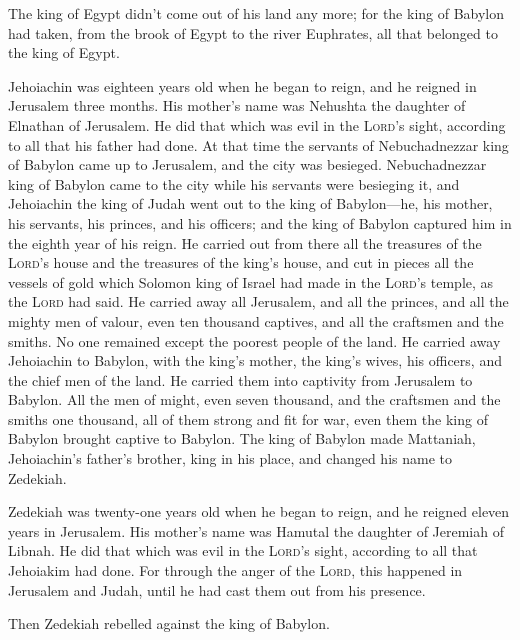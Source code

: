  The king of Egypt didn't come out of his land any more;
for the king of Babylon had taken, from the brook of Egypt to the river
Euphrates, all that belonged to the king of Egypt.

 Jehoiachin was eighteen years old when he began to reign,
and he reigned in Jerusalem three months. His mother's name was Nehushta
the daughter of Elnathan of Jerusalem.  He did that which
was evil in the \textsc{Lord}'s sight, according to all that his father
had done.  At that time the servants of Nebuchadnezzar
king of Babylon came up to Jerusalem, and the city was besieged.
 Nebuchadnezzar king of Babylon came to the city while
his servants were besieging it,  and Jehoiachin the king
of Judah went out to the king of Babylon---he, his mother, his servants,
his princes, and his officers; and the king of Babylon captured him in
the eighth year of his reign.  He carried out from there
all the treasures of the \textsc{Lord}'s house and the treasures of the
king's house, and cut in pieces all the vessels of gold which Solomon
king of Israel had made in the \textsc{Lord}'s temple, as the
\textsc{Lord} had said.  He carried away all Jerusalem,
and all the princes, and all the mighty men of valour, even ten thousand
captives, and all the craftsmen and the smiths. No one remained except
the poorest people of the land.  He carried away
Jehoiachin to Babylon, with the king's mother, the king's wives, his
officers, and the chief men of the land. He carried them into captivity
from Jerusalem to Babylon.  All the men of might, even
seven thousand, and the craftsmen and the smiths one thousand, all of
them strong and fit for war, even them the king of Babylon brought
captive to Babylon.  The king of Babylon made Mattaniah,
Jehoiachin's father's brother, king in his place, and changed his name
to Zedekiah.

 Zedekiah was twenty-one years old when he began to
reign, and he reigned eleven years in Jerusalem. His mother's name was
Hamutal the daughter of Jeremiah of Libnah.  He did that
which was evil in the \textsc{Lord}'s sight, according to all that
Jehoiakim had done.  For through the anger of the
\textsc{Lord}, this happened in Jerusalem and Judah, until he had cast
them out from his presence.

Then Zedekiah rebelled against the king of Babylon.

